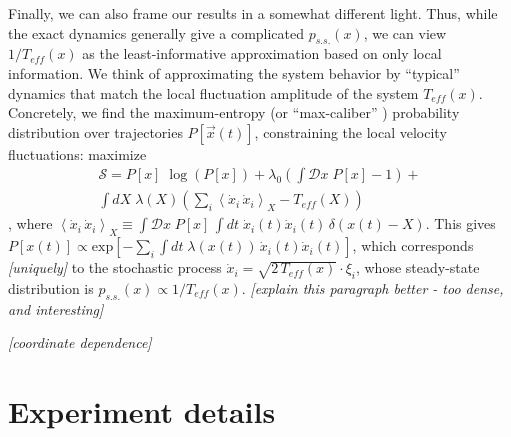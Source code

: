 \documentclass[reprint,prx]{revtex4-1}
\renewcommand{\v}[1]{\ensuremath{\vec{#1}}} %
\renewcommand{\=}[1]{\stackrel{#1}{=}} %
\renewcommand{\(}{\left (}
\renewcommand{\)}{\right  )}
\renewcommand{\[}{\left [}
\renewcommand{\]}{\right ]}
\newcommand{\<}{\left <}
\renewcommand{\>}{\right >}
\theoremstyle{definition}
\theoremstyle{remark}
\renewcommand{\exp}[1]{\mbox{exp}\[#1\]} %
\renewcommand{\todo}[1]{\textit{\color{red}[#1]}}
\begin{document}
Finally, we can also frame our results in a somewhat different light. 
Thus, while the exact dynamics generally give a complicated $ p_{s.s.}(x) $, we can view $1/T_{eff}(x) $ as the least-informative approximation based on only local information.
We think of approximating the system behavior by ``typical'' dynamics that match the local fluctuation amplitude of the system $ T_{eff}(x) $. Concretely, we find the maximum-entropy (or ``max-caliber'' \cite{dill18max_caliber}) probability distribution over trajectories $ P[\v{x}(t)] $, constraining the local velocity fluctuations: maximize 
\begin{align*}
\mathcal{S} = P[x] \;\log\(P[x]\) + \lambda_0 \( \int \mathcal{D} x \;P[x] - 1\) + \\
\int dX \; \lambda(X) \(\sum _i \< \dot{x}_i\,\dot{x}_i\> _X - T_{eff}(X)\)
\end{align*}, where $ \< \dot{x}_i\, \dot{x}_i\> _X \equiv \int \mathcal{D}x \; P[x] \,\int dt \; \dot{x}_i(t) \dot{x}_i(t) \,\delta(x(t) - X) $. This gives $ P[x(t)] \propto \exp{-\sum_i \int dt \; \lambda(x(t))\,\dot{x}_i(t)\dot{x}_i(t)} $, which corresponds \todo{uniquely} to the stochastic process $ \dot{x}_i = \sqrt{2\,T_{eff}(x)}\cdot \xi_i$, whose steady-state distribution is $ p_{s.s.}(x)\propto 1/T_{eff}(x) $. \todo{explain this paragraph better - too dense, and interesting}


\todo{coordinate dependence}









\appendix
\renewcommand{\thesection}{\Alph{section}} 
\section{Experiment details} \label{app:experiment}
\end{document}
